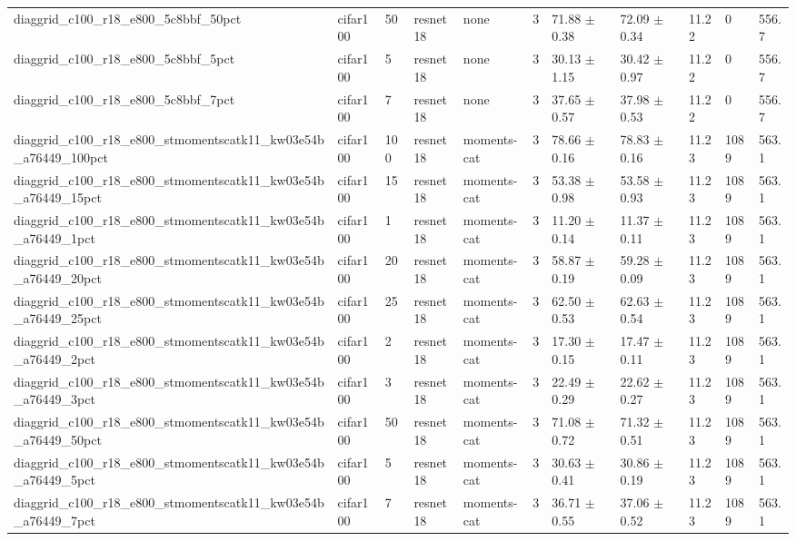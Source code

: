 \begin{tabular}{lllllllllll}
diaggrid_c100_r18_e800_5c8bbf_50pct & cifar100 & 50 & resnet18 & none & 3 & 71.88 $\pm$ 0.38 & 72.09 $\pm$ 0.34 & 11.22 & 0 & 556.7 \\
diaggrid_c100_r18_e800_5c8bbf_5pct & cifar100 & 5 & resnet18 & none & 3 & 30.13 $\pm$ 1.15 & 30.42 $\pm$ 0.97 & 11.22 & 0 & 556.7 \\
diaggrid_c100_r18_e800_5c8bbf_7pct & cifar100 & 7 & resnet18 & none & 3 & 37.65 $\pm$ 0.57 & 37.98 $\pm$ 0.53 & 11.22 & 0 & 556.7 \\
diaggrid_c100_r18_e800_stmomentscatk11_kw03e54b_a76449_100pct & cifar100 & 100 & resnet18 & moments-cat & 3 & 78.66 $\pm$ 0.16 & 78.83 $\pm$ 0.16 & 11.23 & 1089 & 563.1 \\
diaggrid_c100_r18_e800_stmomentscatk11_kw03e54b_a76449_15pct & cifar100 & 15 & resnet18 & moments-cat & 3 & 53.38 $\pm$ 0.98 & 53.58 $\pm$ 0.93 & 11.23 & 1089 & 563.1 \\
diaggrid_c100_r18_e800_stmomentscatk11_kw03e54b_a76449_1pct & cifar100 & 1 & resnet18 & moments-cat & 3 & 11.20 $\pm$ 0.14 & 11.37 $\pm$ 0.11 & 11.23 & 1089 & 563.1 \\
diaggrid_c100_r18_e800_stmomentscatk11_kw03e54b_a76449_20pct & cifar100 & 20 & resnet18 & moments-cat & 3 & 58.87 $\pm$ 0.19 & 59.28 $\pm$ 0.09 & 11.23 & 1089 & 563.1 \\
diaggrid_c100_r18_e800_stmomentscatk11_kw03e54b_a76449_25pct & cifar100 & 25 & resnet18 & moments-cat & 3 & 62.50 $\pm$ 0.53 & 62.63 $\pm$ 0.54 & 11.23 & 1089 & 563.1 \\
diaggrid_c100_r18_e800_stmomentscatk11_kw03e54b_a76449_2pct & cifar100 & 2 & resnet18 & moments-cat & 3 & 17.30 $\pm$ 0.15 & 17.47 $\pm$ 0.11 & 11.23 & 1089 & 563.1 \\
diaggrid_c100_r18_e800_stmomentscatk11_kw03e54b_a76449_3pct & cifar100 & 3 & resnet18 & moments-cat & 3 & 22.49 $\pm$ 0.29 & 22.62 $\pm$ 0.27 & 11.23 & 1089 & 563.1 \\
diaggrid_c100_r18_e800_stmomentscatk11_kw03e54b_a76449_50pct & cifar100 & 50 & resnet18 & moments-cat & 3 & 71.08 $\pm$ 0.72 & 71.32 $\pm$ 0.51 & 11.23 & 1089 & 563.1 \\
diaggrid_c100_r18_e800_stmomentscatk11_kw03e54b_a76449_5pct & cifar100 & 5 & resnet18 & moments-cat & 3 & 30.63 $\pm$ 0.41 & 30.86 $\pm$ 0.19 & 11.23 & 1089 & 563.1 \\
diaggrid_c100_r18_e800_stmomentscatk11_kw03e54b_a76449_7pct & cifar100 & 7 & resnet18 & moments-cat & 3 & 36.71 $\pm$ 0.55 & 37.06 $\pm$ 0.52 & 11.23 & 1089 & 563.1 \\

\end{tabular}
